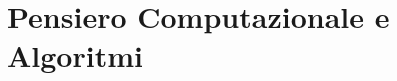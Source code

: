 \documentclass[11pt,a4paper,openany]{book}
\begin{document}
\clearpage

\tableofcontents
\clearpage

\mainmatter

\part{Pensiero Computazionale e Algoritmi}









% 

% 

% 
% 

% 
\end{document}
